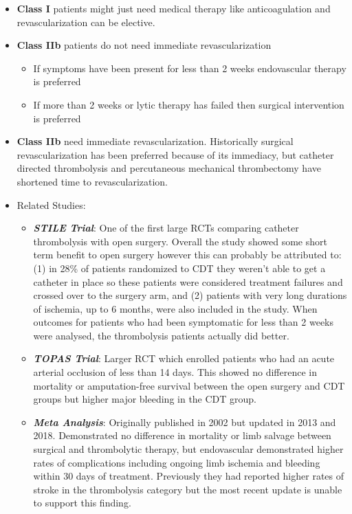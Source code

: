 \documentclass[
]{book}
\begin{document}
\begin{itemize}
\item
  \textbf{Class I} patients might just need medical therapy like anticoagulation
  and revascularization can be elective.~
\item
  \textbf{Class IIb} patients do not need immediate revascularization

  \begin{itemize}
  \item
    If symptoms have been present for less than 2 weeks endovascular
    therapy is preferred
  \item
    If more than 2 weeks or lytic therapy has failed then surgical
    intervention is preferred~
  \end{itemize}
\item
  \textbf{Class IIb} need immediate revascularization. Historically surgical
  revascularization has been preferred because of its immediacy, but
  catheter directed thrombolysis and percutaneous mechanical
  thrombectomy have shortened time to revascularization.~
\item
  Related Studies:

  \begin{itemize}
  \item
    \textbf{\emph{STILE Trial}}: One of the first large RCTs comparing catheter
    thrombolysis with open surgery. Overall the study showed some
    short term benefit to open surgery however this can probably be
    attributed to: (1) in 28\% of patients randomized
    to CDT they weren't able to get a catheter in place so these
    patients were considered treatment failures and crossed over to
    the surgery arm, and (2) patients with very long durations of
    ischemia, up to 6 months, were also included in the study. When
    outcomes for patients who had been symptomatic for less than 2
    weeks were analysed, the thrombolysis patients actually did better.
    \citep{thestileinvestigatorsResultsProspectiveRandomized1994}
  \item
    \textbf{\emph{TOPAS Trial}}: Larger RCT which enrolled patients who had an
    acute arterial occlusion of less than 14 days. This showed no
    difference in mortality or amputation-free survival between the open
    surgery and CDT groups but higher major bleeding in the CDT group.
    \citep{ourielComparisonRecombinantUrokinase1998}
  \item
    \textbf{\emph{Meta Analysis}}: Originally published in 2002 but updated
    in 2013 and 2018. Demonstrated no difference in mortality or limb
    salvage between surgical and thrombolytic therapy, but
    endovascular demonstrated higher rates of complications
    including ongoing limb ischemia and bleeding within 30 days of
    treatment. Previously they had reported higher rates of stroke
    in the thrombolysis category but the most recent update is
    unable to support this finding.
    \citep{darwoodSurgeryThrombolysisInitial2018}


\end{itemize}
\end{itemize}
\end{document}
